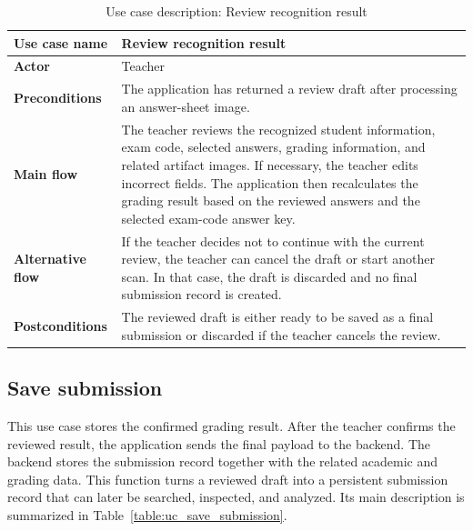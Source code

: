 \documentclass[../Main.tex]{subfiles}
\begin{document}
\begin{table}[H]
    \centering
    \caption{Use case description: Review recognition result}
    \label{table:uc_review_result}
    \renewcommand{\arraystretch}{1.25}
    \begin{tabular}{|p{}|p{}|}
        \hline
        \textbf{Use case name} & Review recognition result \\
        \hline
        \textbf{Actor} & Teacher \\
        \hline
        \textbf{Preconditions} & The application has returned a review draft after processing an answer-sheet image. \\
        \hline
        \textbf{Main flow} & The teacher reviews the recognized student information, exam code, selected answers, grading information, and related artifact images. If necessary, the teacher edits incorrect fields. The application then recalculates the grading result based on the reviewed answers and the selected exam-code answer key. \\
        \hline
        \textbf{Alternative flow} & If the teacher decides not to continue with the current review, the teacher can cancel the draft or start another scan. In that case, the draft is discarded and no final submission record is created. \\
        \hline
        \textbf{Postconditions} & The reviewed draft is either ready to be saved as a final submission or discarded if the teacher cancels the review. \\
        \hline
    \end{tabular}
\end{table}

\subsection{Save submission}
\label{subsection:2.3.5}

This use case stores the confirmed grading result. After the teacher confirms the
reviewed result, the application sends the final payload to the backend. The
backend stores the submission record together with the related academic and
grading data. This function turns a reviewed draft into a persistent submission
record that can later be searched, inspected, and analyzed. Its main
description is summarized in Table~\ref{table:uc_save_submission}.
\end{document}
